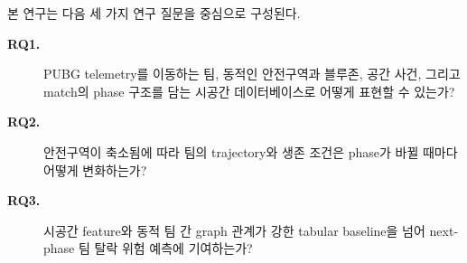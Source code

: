 본 연구는 다음 세 가지 연구 질문을 중심으로 구성된다.
\begin{description}
  \item[\textbf{RQ1.}] PUBG telemetry를 이동하는 팀, 동적인 안전구역과 블루존, 공간 사건, 그리고 match의 phase 구조를 담는 시공간 데이터베이스로 어떻게 표현할 수 있는가?
  \item[\textbf{RQ2.}] 안전구역이 축소됨에 따라 팀의 trajectory와 생존 조건은 phase가 바뀔 때마다 어떻게 변화하는가?
  \item[\textbf{RQ3.}] 시공간 feature와 동적 팀 간 graph 관계가 강한 tabular baseline을 넘어 next-phase 팀 탈락 위험 예측에 기여하는가?
\end{description}
